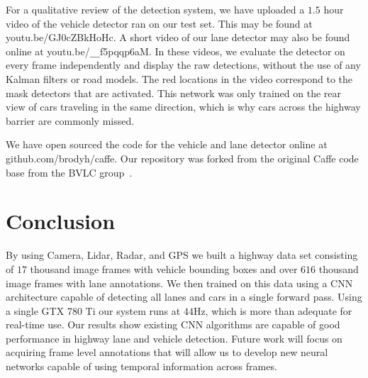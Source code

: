\documentclass[journal]{IEEEtran}
\begin{document}
For a qualitative review of the detection system, we have uploaded a $1.5$ hour video of the vehicle detector ran on our test set. This may be found at youtu.be/GJ0cZBkHoHc. A short video of our lane detector may also be found online at youtu.be/\texttt{\_\_}f5pqqp6aM. In these videos, we evaluate the detector on every frame independently and display the raw detections, without the use of any Kalman filters or road models. The red locations in the video correspond to the mask detectors that are activated. This network was only trained on the rear view of cars traveling in the same direction, which is why cars across the highway barrier are commonly missed.

We have open sourced the code for the vehicle and lane detector online at github.com/brodyh/caffe. Our repository was forked from the original Caffe code base from the BVLC group~\cite{jia-2014}.

\section{Conclusion}
By using Camera, Lidar, Radar, and GPS we built a highway data set consisting of $17$ thousand image frames with vehicle bounding boxes and over $616$ thousand image frames with lane annotations. We then trained on this data using a CNN architecture capable of detecting all lanes and cars in a single forward pass. Using a single GTX 780 Ti our system runs at $44$Hz, which is more than adequate for real-time use. Our results show existing CNN algorithms are capable of good performance in highway lane and vehicle detection. Future work will focus on acquiring frame level annotations that will allow us to develop new neural networks capable of using temporal information across frames.

%


%
%
\end{document}
